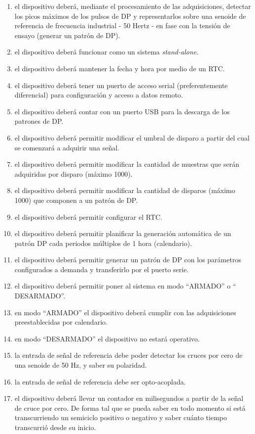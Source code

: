 \begin{enumerate}[label=\textbf{Req \arabic*}]
\item el dispositivo deberá, mediante el procesamiento de las adquisiciones, detectar los picos máximos de los pulsos de DP y representarlos sobre una senoide de referencia de frecuencia industrial - 50 Hertz - en fase con la tensión de ensayo (generar un patrón de DP).
\item el dispositivo deberá funcionar como un sistema \textit{stand-alone}.
\item el dispositivo deberá mantener la fecha y hora por medio de un RTC.
\item el dispositivo deberá tener un puerto de acceso serial (preferentemente diferencial) para configuración y acceso a datos remoto.
\item el dispositivo deberá contar con un puerto USB para la descarga de los patrones de DP.
\item el dispositivo deberá permitir modificar el umbral de disparo a partir del cual se comenzará a adquirir una señal.
\item el dispositivo deberá permitir modificar la cantidad de muestras que serán adquiridas por disparo (máximo 1000).
\item el dispositivo deberá permitir modificar la cantidad de disparos (máximo 1000) que componen a un patrón de DP.
\item el dispositivo deberá permitir configurar el RTC.
\item el dispositivo deberá permitir planificar la generación automática de un patrón DP cada periodos múltiplos de 1 hora (calendario).
\item el dispositivo deberá permitir generar un patrón de DP con los parámetros configurados a demanda y transferirlo por el puerto serie.
\item el dispositivo deberá permitir poner al sistema en modo “ARMADO” o “ DESARMADO”.
\item en modo “ARMADO” el dispositivo deberá cumplir con las adquisiciones preestablecidas por calendario.
\item en modo “DESARMADO” el dispositivo no estará operativo.
\item la entrada de señal de referencia debe poder detectar los cruces por cero de una senoide de 50 Hz, y saber su polaridad.
\item la entrada de señal de referencia debe ser opto-acoplada.
\item el dispositivo deberá llevar un contador en milisegundos a partir de la señal de cruce por cero. De forma tal que se pueda saber en todo momento si está transcurriendo un semiciclo positivo o negativo y saber cuánto tiempo transcurrió desde su inicio.

\end{enumerate}
